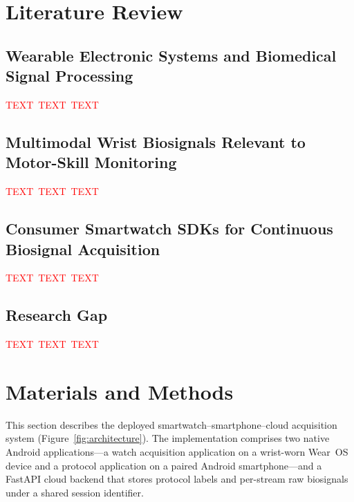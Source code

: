 \documentclass[sensors,article,submit,pdftex,moreauthors]{Definitions/mdpi}
\newcommand{\ph}{\textcolor{red}{TEXT}}
\newcommand{\phh}{\ph{}\ \ph{}\ \ph{}}
\begin{document}

\section{Literature Review}



\subsection{Wearable Electronic Systems and Biomedical Signal Processing}



\phh



\subsection{Multimodal Wrist Biosignals Relevant to Motor-Skill Monitoring}



\phh



\subsection{Consumer Smartwatch SDKs for Continuous Biosignal Acquisition}



\phh



\subsection{Research Gap}

\label{sec:gap}



\phh




\section{Materials and Methods}



This section describes the deployed smartwatch--smartphone--cloud acquisition system (Figure~\ref{fig:architecture}). The implementation comprises two native Android applications---a watch acquisition application on a wrist-worn Wear~OS device and a protocol application on a paired Android smartphone---and a FastAPI cloud backend that stores protocol labels and per-stream raw biosignals under a shared session identifier.
\end{document}
